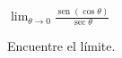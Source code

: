 \item $\displaystyle \lim_{\theta \to 0} \frac{\operatorname{sen}(\cos \theta)}{\sec \theta}$
\par
Encuentre el límite.
